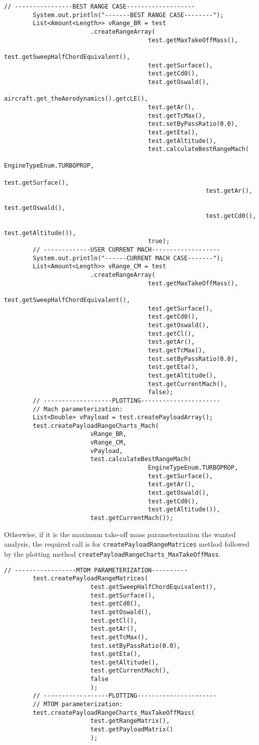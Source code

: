 \bigskip
\begin{lstlisting}[caption={Excerpt of the ATR-72 Payload-Range test - Payload-Range diagram evaluation and plot}, captionpos=b, tabsize=2]
		// ----------------BEST RANGE CASE-------------------
		System.out.println("-------BEST RANGE CASE--------");
		List<Amount<Length>> vRange_BR = test
						.createRangeArray(
										test.getMaxTakeOffMass(),
										test.getSweepHalfChordEquivalent(),
										test.getSurface(),
										test.getCd0(),
										test.getOswald(),
										aircraft.get_theAerodynamics().getcLE(),
										test.getAr(),
										test.getTcMax(),
										test.setByPassRatio(0.0),
										test.getEta(),
										test.getAltitude(),
										test.calculateBestRangeMach(
														EngineTypeEnum.TURBOPROP,
														test.getSurface(),
														test.getAr(),
														test.getOswald(),
														test.getCd0(),
														test.getAltitude()),
										true);		
		// -------------USER CURRENT MACH-------------------
		System.out.println("------CURRENT MACH CASE-------");
		List<Amount<Length>> vRange_CM = test
						.createRangeArray(
										test.getMaxTakeOffMass(),
										test.getSweepHalfChordEquivalent(),
										test.getSurface(),
										test.getCd0(),
										test.getOswald(),
										test.getCl(),
										test.getAr(),
										test.getTcMax(),
										test.setByPassRatio(0.0),
										test.getEta(),
										test.getAltitude(),
										test.getCurrentMach(),
										false);
		// -------------------PLOTTING----------------------	
		// Mach parameterization:
		List<Double> vPayload = test.createPayloadArray();
		test.createPayloadRangeCharts_Mach(
						vRange_BR,
						vRange_CM,
						vPayload,
						test.calculateBestRangeMach(
										EngineTypeEnum.TURBOPROP,
										test.getSurface(),
										test.getAr(),
										test.getOswald(),
										test.getCd0(),
										test.getAltitude()),
						test.getCurrentMach());
\end{lstlisting}
%
\noindent
Otherwise, if it is the maximum take-off mass parameterization the wanted analysis, the required call is for \lstinline[language=Java]!createPayloadRangeMatrices! method followed by the plotting method \lstinline[language=Java]!createPayloadRangeCharts_MaxTakeOffMass!. 

\bigskip
\begin{lstlisting}[caption={Excerpt of the ATR-72 Payload-Range test - maximum take-off mass parameterization}, captionpos=b, tabsize=2]
		// -----------------MTOM PARAMETERIZATION----------
		test.createPayloadRangeMatrices(
						test.getSweepHalfChordEquivalent(),
						test.getSurface(),
						test.getCd0(),
						test.getOswald(),
						test.getCl(),
						test.getAr(),
						test.getTcMax(),
						test.setByPassRatio(0.0),
						test.getEta(),
						test.getAltitude(),
						test.getCurrentMach(),
						false
						);
		// ------------------PLOTTING----------------------		
		// MTOM parameterization:
		test.createPayloadRangeCharts_MaxTakeOffMass(
						test.getRangeMatrix(),
						test.getPayloadMatrix()
						);
\end{lstlisting}

